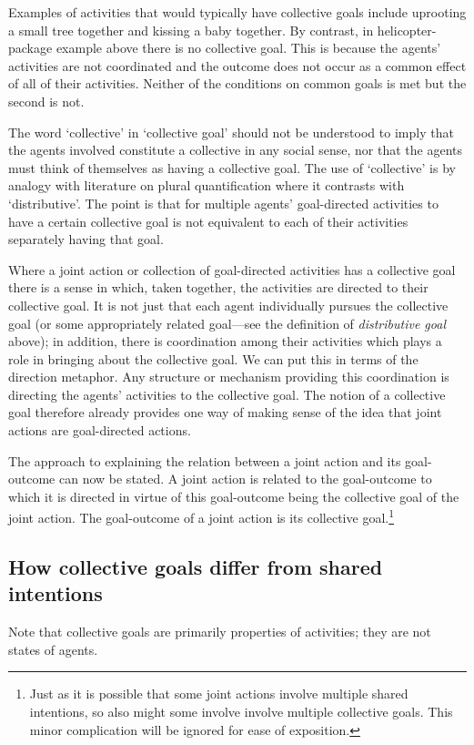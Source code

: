 \documentclass[12pt,a4paper]{extarticle}
\begin{document}
Examples of activities that would typically have collective goals include uprooting a small tree together and kissing a baby together.
By contrast,
in helicopter-package example above there is no collective goal.  This is because the agents' activities are not coordinated and the outcome does not occur as a common effect of all of their activities.  Neither of the conditions on common goals is met but the second is not.  

The word `collective' in `collective goal' should not be understood to imply that the agents  involved constitute a collective in any social sense, nor that the agents must think of themselves as having a collective goal.  The use of `collective' is by analogy with literature on plural quantification where it contrasts with `distributive'.  The point is that for multiple agents' goal-directed activities to have a certain collective goal is not equivalent to each of their activities separately having that goal.


Where a joint action or collection of goal-directed activities has a collective goal there is a sense in which, taken together, the activities are directed to their collective goal.  It is not just that each agent individually pursues the collective goal (or some appropriately related goal---see the definition of \emph{distributive goal} above); in addition, there is coordination among their activities which plays a role in bringing about the collective goal.  We can put this in terms of the direction metaphor.  Any structure or mechanism providing this coordination is directing the agents' activities to the collective goal.  The notion of a collective goal therefore already provides one way of making sense of the idea that joint actions are goal-directed actions.

The approach to explaining the relation between a joint action and its goal-outcome can now be stated.  A joint action is related to the goal-outcome to which it is directed in virtue of this goal-outcome being the collective goal of the joint action.  The goal-outcome of a joint action is its collective goal.\footnote{  
Just as it is possible that some joint actions involve multiple shared intentions, so also might some involve involve multiple collective goals.  This minor complication will be ignored for ease of exposition.
}


\subsection{How collective goals differ from shared intentions}
Note that collective goals are primarily properties of activities; they are not states of agents.  
\end{document}
